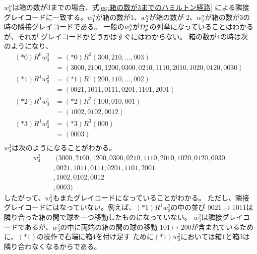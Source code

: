 	$w_k^n$は箱の数が$3$までの場合、式\eqref{eq:箱の数が3までのハミルトン経路}
	による隣接グレイコードに一致する。$w_1^n$が箱の数が$1$、$w_2^n$が箱の数が
	$2$、$w_3^n$が箱の数が$3$の時の隣接グレイコードである。
	一般の$w_k^n$が${\mathcal{D}}_k^n$の列挙になっていることはわかるが、それが
	グレイコードかどうかはすぐにはわからない。
	箱の数が$4$の時は次のようになり、
	\begin{equation*}\begin{split} %
		(*0)R^0w_3^3 &= (*0)R^0(300,210,\dots,003) \\
			&= (3000,2100,1200,0300,0210,1110,2010,1020,0120,0030) \\
		(*1)R^1w_3^2 &= (*1)R^1(200,110,\dots,002) \\
			&= (0021,1011,0111,0201,1101,2001) \\
		(*2)R^1w_3^1 &= (*2)R^2(100,010,001) \\
			&= (1002,0102,0012) \\
		(*3)R^1w_3^0 &= (*3)R^3(000) \\
			&= (0003) \\
	\end{split}\end{equation*} %
	$w_4^3$は次のようになることがわかる。
	\begin{equation}\label{eq:箱の数が4のグレイコード}\begin{split} %
		w_4^3 &= (3000,2100,1200,0300,0210,1110,2010,1020,0120,0030 \\
			&\quad ,0021,1011,0111,0201,1101,2001 \\
			&\quad ,1002,0102,0012 \\
			&\quad ,0003)
	\end{split}\end{equation} %
	したがって、$w_4^3$もまたグレイコードになっていることがわかる。
	ただし、隣接グレイコードにはなっていない。例えば、$(*1)R^1w_3^2$の中の並び
	$0021\mapsto1011$は隣り合った箱の間で球を一つ移動したものになっていない。
	$w_3^2$は隣接グレイコードであるが、$w_3^2$の中に両端の箱の間の球の移動
	$101\mapsto200$が含まれているために、$(*1)$の操作で右端に箱$4$を付け足す
	ために$(*1)w_3^2$においては箱$1$と箱$3$は隣り合わなくなるからである。


